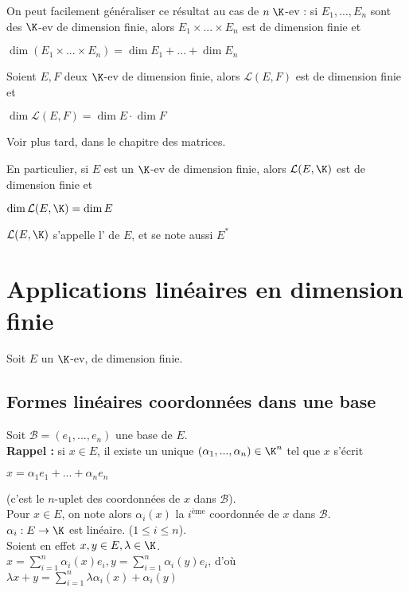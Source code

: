 \documentclass[12pt, a4paper]{report}
\begin{document}
\begin{remarque}
On peut facilement généraliser ce résultat au cas de $n \; \K$-ev : si $E_1,...,E_n$ sont des $\K$-ev de dimension finie, alors $E_1 \times ... \times E_n$ est de dimension finie et 
\begin{center}
$\dim (E_1 \times ... \times E_n) = \dim E_1 + ... + \dim E_n$
\end{center}
\end{remarque}

\begin{theoreme}{}{}
Soient $E,F$ deux $\K$-ev de dimension finie, alors $\mathcal{L}(E,F)$ est de dimension finie et 
\begin{center}
$\dim \mathcal{L}(E,F) = \dim E \cdot \dim F$
\end{center}
\end{theoreme}

\begin{demo}{}
Voir plus tard, dans le chapitre des matrices.
\end{demo}

\begin{remarque}
En particulier, si $E$ est un $\K$-ev de dimension finie, alors $\mathcal{L}(E,\K)$ est de dimension finie et 
\begin{center}
$\dim \mathcal{L}(E,\K) = \dim E$
\end{center}
$\mathcal{L}(E,\K)$ s'appelle l' de $E$, et se note aussi $E^*$
\end{remarque}

\newpage

\section{Applications linéaires en dimension finie}

Soit $E$ un $\K$-ev, de dimension finie.

\subsection{Formes linéaires coordonnées dans une base}

Soit $\mathcal{B} = (e_1,...,e_n)$ une base de $E$. \\
\textbf{Rappel :} si $x \in E$, il existe un unique $(\alpha_1,...,\alpha_n) \in \K^n$ tel que $x$ s'écrit \\
\begin{center}
$x = \alpha_1e_1+...+\alpha_ne_n$
\end{center}
(c'est le $n$-uplet des coordonnées de $x$ dans $\mathcal{B}$). \\
Pour $x \in E$, on note alors $\alpha_i(x)$ la $i^\text{ème}$ coordonnée de $x$ dans $\mathcal{B}$. \\
$\alpha_i : E \to \K$ est linéaire. ($1 \le i \le n$). \\
Soient en effet $x, y \in E, \lambda \in \K$. \\
$x = \displaystyle{\sum_{i=1}^n \alpha_i(x) e_i}, y = \displaystyle{\sum_{i=1}^n \alpha_i(y)e_i}$, d'où
$\lambda x + y = \displaystyle{\sum_{i=1}^n \lambda \alpha_i(x) + \alpha_i(y)}$ \\
\end{document}
